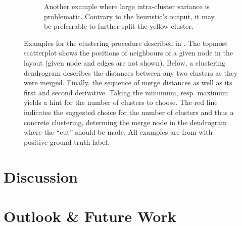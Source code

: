 \documentclass[
	fontsize=10pt, %
	twoside=false, %
	secnumdepth=1, %
  toc=indentunnumbered %
]{kaobook}
\begin{document}
\begin{figure}[h]
\begin{subfigure}{0.48\linewidth}
        \caption{Another example where large intra-cluster variance is
          problematic. Contrary to the heuristic's output, it may be preferrable
          to further split the yellow cluster.}
      \end{subfigure}
      \caption[
      Example outputs of the heuristic for attaching edges after node
      duplication has been decided.
      ]
      {
    Examples for the clustering procedure described in . The topmost scatterplot shows the positions of neighbours
    of a given node in the layout (given node and edges are not shown). Below, a clustering dendrogram describes
    the distances between any two clusters as they were merged. Finally, the
    sequence of merge distances as well as its first and second derivative.
    Taking the minumum, resp. maximum yields a hint for the number of clusters
    to choose. The red line indicates the suggested choice for the number of
    clusters and thus a concrete clustering, determing the merge node in the
    dendrogram where the ``cut'' should be made.
    All examples are from \ADLast{} with positive ground-truth label.}
  \label{fig:neighb-clust-examples}
\end{figure}


\chapter{Discussion}
\label{sec:discussion}






\chapter{Outlook \& Future Work}
\label{sec:future-work}



\end{document}

